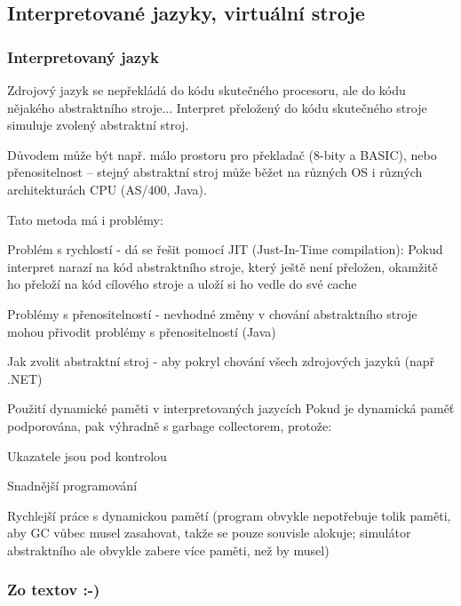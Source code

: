 \subsection{Interpretované jazyky, virtuální stroje}

\subsubsection*{Interpretovaný jazyk}

Zdrojový jazyk se nepřekládá do kódu skutečného procesoru, ale do kódu nějakého abstraktního stroje... Interpret přeložený do kódu skutečného stroje simuluje zvolený abstraktní stroj.

Důvodem může být např. málo prostoru pro překladač (8-bity a BASIC), nebo přenositelnost -- stejný abstraktní stroj může běžet na různých OS i různých architekturách CPU (AS/400, Java).

Tato metoda má i problémy:

\begin{pitemize}
	\item Problém s rychlostí - dá se řešit pomocí JIT (Just-In-Time compilation): Pokud interpret narazí na kód abstraktního stroje, který ještě není přeložen, okamžitě ho přeloží na kód cílového stroje a uloží si ho vedle do své cache
	\item Problémy s přenositelností - nevhodné změny v chování abstraktního stroje mohou přivodit problémy s přenositelností (Java)
	\item Jak zvolit abstraktní stroj - aby pokryl chování všech zdrojových jazyků (např .NET)
\end{pitemize}

\begin{obecne}{Použití dynamické paměti v interpretovaných jazycích}
Pokud je dynamická paměť podporována, pak výhradně s garbage collectorem, protože:
\begin{pitemize}
	\item Ukazatele jsou pod kontrolou
	\item Snadnější programování
	\item Rychlejší práce s dynamickou pamětí (program obvykle nepotřebuje tolik paměti, aby GC vůbec musel zasahovat, takže se pouze souvisle alokuje; simulátor abstraktního ale obvykle zabere více paměti, než by musel)
\end{pitemize}
\end{obecne}

\subsubsection*{Zo  textov :-)}

